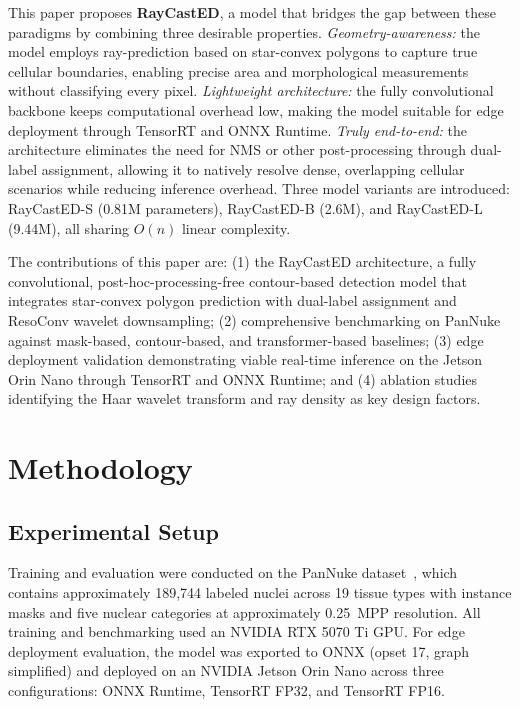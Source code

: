 \documentclass[conference]{IEEEtran}
\begin{document}
This paper proposes \textbf{RayCastED}, a model that bridges the gap between these paradigms by combining three desirable properties. \textit{Geometry-awareness:} the model employs ray-prediction based on star-convex polygons to capture true cellular boundaries, enabling precise area and morphological measurements without classifying every pixel. \textit{Lightweight architecture:} the fully convolutional backbone keeps computational overhead low, making the model suitable for edge deployment through TensorRT and ONNX Runtime. \textit{Truly end-to-end:} the architecture eliminates the need for NMS or other post-processing through dual-label assignment, allowing it to natively resolve dense, overlapping cellular scenarios while reducing inference overhead. Three model variants are introduced: RayCastED-S (0.81M parameters), RayCastED-B (2.6M), and RayCastED-L (9.44M), all sharing $O(n)$ linear complexity.

The contributions of this paper are: (1) the RayCastED architecture, a fully convolutional, post-hoc-processing-free contour-based detection model that integrates star-convex polygon prediction with dual-label assignment and ResoConv wavelet downsampling; (2) comprehensive benchmarking on PanNuke~\cite{gamper2020pannuke} against mask-based, contour-based, and transformer-based baselines; (3) edge deployment validation demonstrating viable real-time inference on the Jetson Orin Nano through TensorRT and ONNX Runtime; and (4) ablation studies identifying the Haar wavelet transform and ray density as key design factors.

\section{Methodology}

\subsection{Experimental Setup}

Training and evaluation were conducted on the PanNuke dataset~\cite{gamper2020pannuke}, which contains approximately 189,744 labeled nuclei across 19 tissue types with instance masks and five nuclear categories at approximately 0.25~MPP resolution. All training and benchmarking used an NVIDIA RTX 5070 Ti GPU. For edge deployment evaluation, the model was exported to ONNX (opset 17, graph simplified) and deployed on an NVIDIA Jetson Orin Nano across three configurations: ONNX Runtime, TensorRT FP32, and TensorRT FP16.
\end{document}
